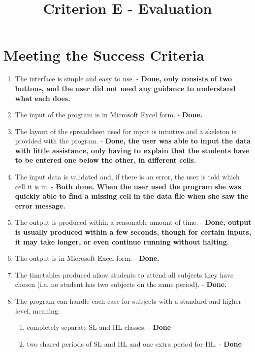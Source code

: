 \documentclass[a4paper, 12pt]{article}
\title{Criterion E - Evaluation}
\author{}
\date{}
\begin{document}
\maketitle

\section{Meeting the Success Criteria}
\begin{enumerate}
    \item The interface is simple and easy to use. - \textbf{Done, only consists of two
        buttons, and the user did not need any guidance to understand what each does.}
    \item The input of the program is in Microsoft Excel form. - \textbf{Done.}
    \item The layout of the spreadsheet used for input is intuitive and a skeleton is
        provided with the program. - \textbf{Done, the user was able to input the data
        with little assistance, only having to explain that the students have to be entered
        one below the other, in different cells.}
    \item The input data is validated and, if there is an error, the user is told which cell
        it is in. - \textbf{Both done. When the user used the program she was quickly able to
        find a missing cell in the data file when she saw the error message.}
    \item The output is produced within a reasonable amount of time. - \textbf{Done, output
        is usually produced within a few seconds, though for certain inputs, it may take
        longer, or even continue running without halting.}
    \item The output is in Microsoft Excel form. - \textbf{Done.}
    \item The timetables produced allow students to attend all subjects they have chosen
        (i.e. no student has two subjects on the same period). - \textbf{Done.}
    \item The program can handle each case for subjects with a standard and higher level,
        meaning:
     \begin{enumerate}
            \item completely separate SL and HL classes. - \textbf{Done}
            \item two shared periods of SL and HL and one extra period for HL. -
                \textbf{Done}
        \end{enumerate}
\end{enumerate}
\end{document}
